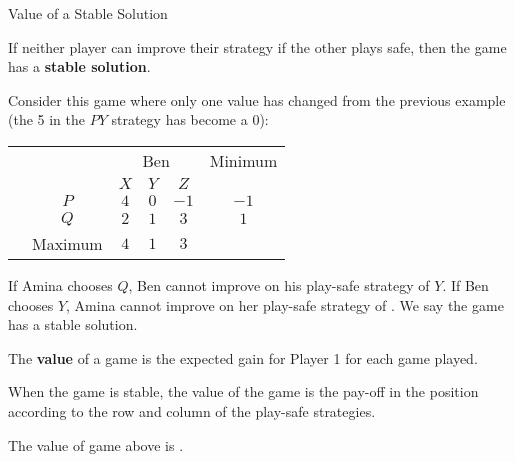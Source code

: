 \documentclass[8pt]{beamer}
\begin{document}
\begin{frame}[shrink=11]{Value of a Stable Solution}
	\begin{definition}
		If neither player can improve their strategy if the other plays safe, then the game has a \textbf{stable solution}.
	\end{definition}

	Consider this game where only one value has changed from the previous example (the 5 in the $PY$ strategy has become a 0):

		\begin{center}
\colorbox{cc}{
	\setlength\arrayrulewidth{0.5mm}
\begin{tabular}{cc|cccc}
	\multicolumn{2}{c}{} & \multicolumn{3}{c}{Ben} & Minimum \\
	\multicolumn{1}{c}{} &  & $X$  & $Y$ & $Z$ & \\ \hline
	\raisebox{0.0cm}{\multirow{2}*{\rotatebox{90}{Amina}}}  & $P$ & $4$ & $0$ & $-1$ & $-1$ \\
							       & $Q$ & $2$ & $1$ & $3$ & $1$\\
							       & Maximum & $4$ &  $1$ &  $3$ & \\
\end{tabular}}
\end{center}


If Amina chooses $Q$, Ben cannot improve on his play-safe strategy of $Y$. If Ben chooses $Y$, Amina cannot improve on her play-safe strategy of . We say the game has a stable solution.

\begin{definition}
	The \textbf{value} of a game is the expected gain for Player 1 for each game played.
\end{definition}
\begin{definition}
	When the game is stable, the value of the game is the pay-off in the position according to the row and column of the play-safe strategies.
\end{definition}

The value of game above is . 

\end{frame}
\end{document}
